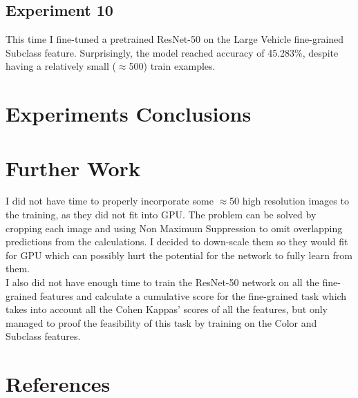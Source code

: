 \documentclass[]{article}
\begin{document}
\subsection{Experiment 10}
This time I fine-tuned a pretrained ResNet-50 on the Large Vehicle fine-grained Subclass feature. Surprisingly, the model reached accuracy of 45.283\%, despite having a relatively small ($\approx$500) train examples.

\section{Experiments Conclusions}

\section{Further Work}
I did not have time to properly incorporate some $\approx$50 high resolution images to the training, as they did not fit into GPU. The problem can be solved by cropping each image and using Non Maximum Suppression to omit overlapping predictions from the calculations. I decided to down-scale them so they would fit for GPU which can possibly hurt the potential for the network to fully learn from them.
\\
I also did not have enough time to train the ResNet-50 network on all the fine-grained features and calculate a cumulative score for the fine-grained task which takes into account all the Cohen Kappas' scores of all the features, but only managed to proof the feasibility of this task by training on the Color and Subclass features.

\section{References}
\end{document}
